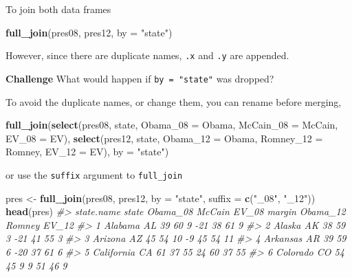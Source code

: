 \documentclass[]{book}
\newenvironment{Shaded}{\begin{snugshade}}{\end{snugshade}}
\newcommand{\CommentTok}[1]{\textcolor[rgb]{0.56,0.35,0.01}{\textit{#1}}}
\newcommand{\DataTypeTok}[1]{\textcolor[rgb]{0.13,0.29,0.53}{#1}}
\newcommand{\KeywordTok}[1]{\textcolor[rgb]{0.13,0.29,0.53}{\textbf{#1}}}
\newcommand{\NormalTok}[1]{#1}
\newcommand{\StringTok}[1]{\textcolor[rgb]{0.31,0.60,0.02}{#1}}
\theoremstyle{definition}
\theoremstyle{definition}
\theoremstyle{definition}
\theoremstyle{remark}
\begin{document}
To join both data frames

\begin{Shaded}
\begin{Highlighting}[]
\KeywordTok{full_join}\NormalTok{(pres08, pres12, }\DataTypeTok{by =} \StringTok{"state"}\NormalTok{)}
\end{Highlighting}
\end{Shaded}

However, since there are duplicate names, \texttt{.x} and \texttt{.y}
are appended.

\textbf{Challenge} What would happen if \texttt{by\ =\ "state"} was
dropped?

To avoid the duplicate names, or change them, you can rename before
merging,

\begin{Shaded}
\begin{Highlighting}[]
\KeywordTok{full_join}\NormalTok{(}\KeywordTok{select}\NormalTok{(pres08, state, }\DataTypeTok{Obama_08 =}\NormalTok{ Obama, }\DataTypeTok{McCain_08 =}\NormalTok{ McCain,}
                 \DataTypeTok{EV_08 =}\NormalTok{ EV),}
          \KeywordTok{select}\NormalTok{(pres12, state, }\DataTypeTok{Obama_12 =}\NormalTok{ Obama, }\DataTypeTok{Romney_12 =}\NormalTok{ Romney,}
                 \DataTypeTok{EV_12 =}\NormalTok{ EV),}
          \DataTypeTok{by =} \StringTok{"state"}\NormalTok{)}
\end{Highlighting}
\end{Shaded}

or use the \texttt{suffix} argument to \texttt{full\_join}

\begin{Shaded}
\begin{Highlighting}[]
\NormalTok{pres <-}\StringTok{ }\KeywordTok{full_join}\NormalTok{(pres08, pres12, }\DataTypeTok{by =} \StringTok{"state"}\NormalTok{, }\DataTypeTok{suffix =} \KeywordTok{c}\NormalTok{(}\StringTok{"_08"}\NormalTok{, }\StringTok{"_12"}\NormalTok{))}
\KeywordTok{head}\NormalTok{(pres)}
\CommentTok{#>   state.name state Obama_08 McCain EV_08 margin Obama_12 Romney EV_12}
\CommentTok{#> 1    Alabama    AL       39     60     9    -21       38     61     9}
\CommentTok{#> 2     Alaska    AK       38     59     3    -21       41     55     3}
\CommentTok{#> 3    Arizona    AZ       45     54    10     -9       45     54    11}
\CommentTok{#> 4   Arkansas    AR       39     59     6    -20       37     61     6}
\CommentTok{#> 5 California    CA       61     37    55     24       60     37    55}
\CommentTok{#> 6   Colorado    CO       54     45     9      9       51     46     9}
\end{Highlighting}
\end{Shaded}
\end{document}

